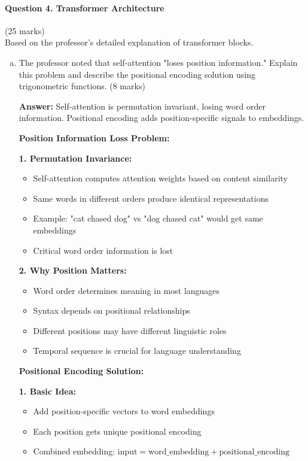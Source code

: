 \documentclass[12pt]{article}
\newcommand{\answer}[1]{{\color{answercolor}\textbf{Answer:} #1}}
\newcommand{\explanation}[1]{{\color{explanationcolor}#1}}
\begin{document}
\newpage
\paragraph{Question 4. Transformer Architecture}\hfill (25 marks)\\
Based on the professor's detailed explanation of transformer blocks.

\begin{enumerate}[(a)]
    \item The professor noted that self-attention "loses position information." Explain this problem and describe the positional encoding solution using trigonometric functions. \hfill (8 marks)
    
    \answer{Self-attention is permutation invariant, losing word order information. Positional encoding adds position-specific signals to embeddings.}
    
    \explanation{
    \textbf{Position Information Loss Problem:}
    
    \textbf{1. Permutation Invariance:}
    \begin{itemize}
        \item Self-attention computes attention weights based on content similarity
        \item Same words in different orders produce identical representations
        \item Example: "cat chased dog" vs "dog chased cat" would get same embeddings
        \item Critical word order information is lost
    \end{itemize}
    
    \textbf{2. Why Position Matters:}
    \begin{itemize}
        \item Word order determines meaning in most languages
        \item Syntax depends on positional relationships
        \item Different positions may have different linguistic roles
        \item Temporal sequence is crucial for language understanding
    \end{itemize}
    
    \textbf{Positional Encoding Solution:}
    
    \textbf{1. Basic Idea:}
    \begin{itemize}
        \item Add position-specific vectors to word embeddings
        \item Each position gets unique positional encoding
        \item Combined embedding: $\text{input} = \text{word\_embedding} + \text{positional\_encoding}$
    \end{itemize}
    
}
\end{enumerate}
\end{document}

